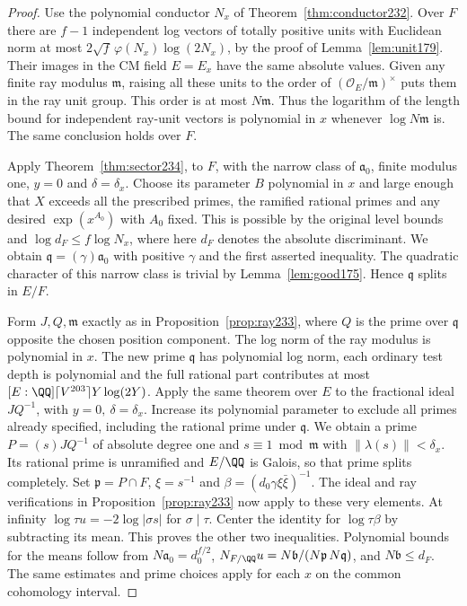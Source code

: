 \documentclass[a4paper,11pt]{article}
\theoremstyle{definition}
\theoremstyle{remark}
\numberwithin{equation}{section}
\newcommand{\OO}{\mathcal O}
\begin{document}
\begin{proof}
Use the polynomial conductor \(N_x\) of Theorem~\ref{thm:conductor232}. Over \(F\) there are \(f-1\)
independent log vectors of totally positive units with Euclidean
norm at most \(2\sqrt f\,\varphi(N_x)\log(2N_x)\), by the proof
of Lemma~\ref{lem:unit179}. Their images in the CM
field \(E=E_x\) have the same absolute values. Given any finite
ray modulus \(\mathfrak m\), raising all these units to the order
of \((\OO_E/\mathfrak m)^\times\) puts them in the ray unit
group. This order is at most \(N\mathfrak m\). Thus the logarithm
of the length bound for independent ray-unit vectors is polynomial
in \(x\) whenever \(\log N\mathfrak m\) is. The same conclusion
holds over \(F\).

Apply Theorem~\ref{thm:sector234}, to \(F\), with
the narrow class of \(\mathfrak a_0\), finite modulus one,
\(y=0\) and \(\delta=\delta_x\). Choose its parameter \(B\)
polynomial in \(x\) and large enough that \(X\) exceeds all
the prescribed primes, the ramified rational primes and any
desired \(\exp(x^{A_0})\) with \(A_0\) fixed. This is possible
by the original level bounds and \(\log d_F\le f\log N_x\),
where here \(d_F\) denotes the absolute discriminant.
We obtain \(\mathfrak q=(\gamma)\mathfrak a_0\) with positive
\(\gamma\) and the first asserted inequality. The quadratic
character of this narrow class is trivial by Lemma~\ref{lem:good175}. Hence \(\mathfrak q\) splits in \(E/F\).

Form \(J,Q,\mathfrak m\) exactly as in Proposition~\ref{prop:ray233},
where \(Q\) is the prime over \(\mathfrak q\) opposite the chosen
position component. The log norm of the ray modulus is polynomial
in \(x\). The new prime \(\mathfrak q\) has polynomial log norm,
each ordinary test depth is polynomial and the full rational part
contributes at most \([E:\QQ]\lceil V^{203}\rceil Y\log(2Y)\).
Apply the same theorem over \(E\) to the fractional ideal
\(JQ^{-1}\), with \(y=0,\ \delta=\delta_x\). Increase its
polynomial parameter to exclude all primes already specified,
including the rational prime under \(\mathfrak q\).
We obtain a prime \(P=(s)JQ^{-1}\) of absolute degree one
and \(s\equiv1\bmod\mathfrak m\) with \(\|\lambda(s)\|<\delta_x\).
Its rational prime is unramified and \(E/\QQ\) is Galois, so that
prime splits completely. Set \(\mathfrak p=P\cap F\),
\(\xi=s^{-1}\) and \(\beta=(d_0\gamma \xi\bar\xi)^{-1}\).
The ideal and ray verifications in Proposition~\ref{prop:ray233}
now apply to these very elements. At infinity \(\log\tau u=
-2\log|\sigma s|\) for \(\sigma\mid\tau\). Center the identity
for \(\log\tau\beta\) by subtracting its mean. This proves the
other two inequalities. Polynomial bounds for the means follow
from \(N\mathfrak a_0=d_0^{f/2}\),
\(N_{F/\QQ}u=N\mathfrak b/(N\mathfrak p\,N\mathfrak q)\),
and \(N\mathfrak b\le d_F\). The same estimates and prime choices
apply for each \(x\) on the common cohomology interval.
\end{proof}
\end{document}
